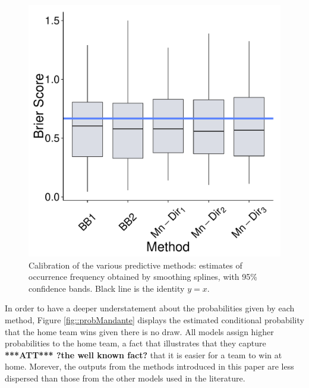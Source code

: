 \documentclass[journal,article,accept,moreauthors,pdftex,12pt,a4paper]{mdpi}
\newcommand{\red}[1]{\textbf{\color{red} ***ATT*** #1}}
\begin{document}
\begin{figure}[H]
\includegraphics[page=9,scale=0.3]{futebolComparacaoModelosForPaper.pdf}
  \caption{Calibration of the various predictive methods: estimates of occurrence frequency obtained by smoothing splines, with 95\% confidence bands. Black line is the identity $y=x$.}
  \label{fig::calibration}
\end{figure}

In order to have a deeper understatement about the probabilities given by each method,
Figure \ref{fig::probMandante} displays the estimated conditional probability that the home team wins given there is no draw.
All models assign higher probabilities to the home team, a fact that illustrates that
they capture \red{?the well known fact?} that it is easier for a team to win at home. 
Morever, the outputs from the methods introduced in this paper
are less dispersed than those from the other models used in the literature.
\end{document}
